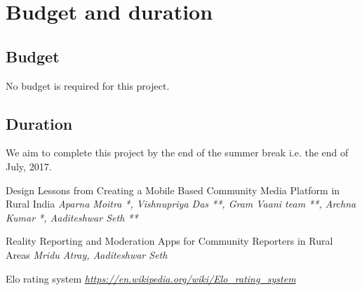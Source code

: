 \documentclass[11pt]{article}
\begin{document}
	\section{Budget and duration}	
		\subsection{Budget}
			No budget is required for this project.			
					
		\subsection{Duration}
			We aim to complete this project by the end of the summer break i.e. the end of July, 2017. 





	\begin{thebibliography}{1}
	
    \bibitem{}
    Design Lessons from Creating a Mobile Based Community Media Platform in Rural India
    \textit{Aparna
Moitra *, Vishnupriya Das **, Gram Vaani team **, Archna Kumar *, Aaditeshwar Seth **}

    \bibitem{}
    Reality Reporting and Moderation Apps for Community Reporters in Rural Areas
    \textit{Mridu Atray, Aaditeshwar Seth}
    
    \bibitem{}
    Elo rating system
    \textit{\href{https://en.wikipedia.org/wiki/Elo_rating_system}{https://en.wikipedia.org/wiki/Elo_rating_system}}


	\end{thebibliography}
\end{document}
